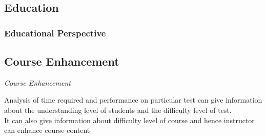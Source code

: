 \documentclass[12pt,xcolor=dvipsnames]{beamer}
\begin{document}
\subsection{Education}
\begin{frame}[t]
\frametitle{Educational Perspective}

\begin{center}
\subsection{Course Enhancement}
\begin{center}
\textit{Course Enhancement}

\end{center}
\begin{center}
Analysis of time required and performance on particular test can give information about the understanding level of students and the difficulty level of test.\\

It  can also give information about difficulty level of course and hence instructor can enhance course content
\end{center}

\end{center}
\end{frame}

\end{document}
